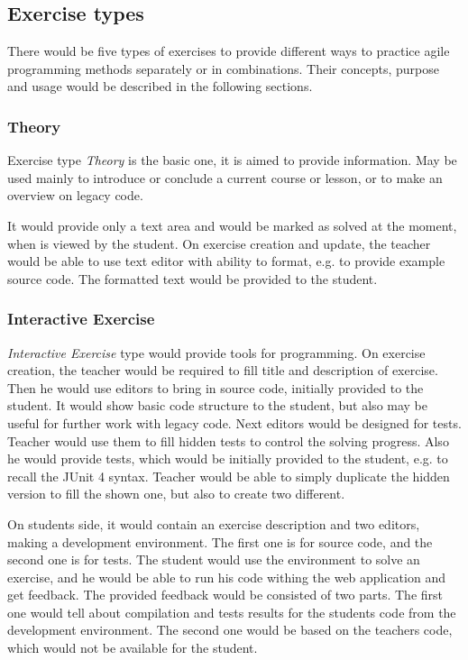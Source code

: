     \subsection{Exercise types}
    \label{subsec:exercise-types}
    There would be five types of exercises to provide different ways to practice agile programming methods separately or in combinations. Their concepts, purpose and usage would be described in the following sections.
        
        
        \subsubsection{Theory}
        Exercise type \textit{Theory} is the basic one, it is aimed to provide information. May be used mainly to introduce or conclude a current course or lesson, or to make an overview on legacy code.
        
        It would provide only a text area and would be marked as solved at the moment, when is viewed by the student. On exercise creation and update, the teacher would be able to use text editor with ability to format, e.g. to provide example source code. The formatted text would be provided to the student.
    
    
        \subsubsection{Interactive Exercise}
        \label{subsubsec:whitebox}
        \textit{Interactive Exercise} type would provide tools for programming.
        On exercise creation, the teacher would be required to fill title and description of exercise. Then he would use editors to bring in source code, initially provided to the student. It would show basic code structure to the student, but also may be useful for further work with legacy code. Next editors would be designed for tests. Teacher would use them to fill hidden tests to control the solving progress. Also he would provide tests, which would be initially provided to the student, e.g. to recall the JUnit 4 syntax. Teacher would be able to simply duplicate the hidden version to fill the shown one, but also to create two different.
        
        On students side, it would contain an exercise description and two editors, making a development environment. The first one is for source code, and the second one is for tests. The student would use the environment to solve an exercise, and he would be able to run his code withing the web application and get feedback. The provided feedback would be consisted of two parts. The first one would tell about compilation and tests results for the students code from the development environment. The second one would be based on the teachers code, which would not be available for the student.
        
